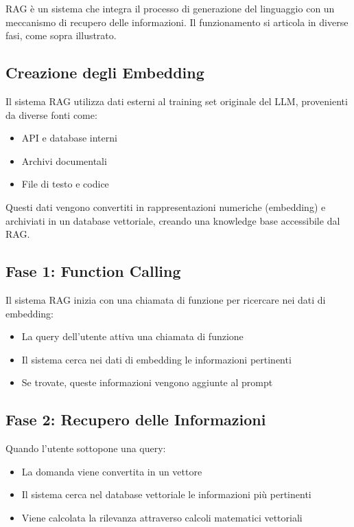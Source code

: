 \documentclass[12pt,a4paper,openright,twoside]{book}
\begin{document}
RAG è un sistema che integra il processo di generazione del linguaggio con un meccanismo di recupero delle informazioni.
Il funzionamento si articola in diverse fasi, come sopra illustrato.

\subsection{Creazione degli Embedding}
Il sistema RAG utilizza dati esterni al training set originale del LLM, provenienti da diverse fonti come:
\begin{itemize}
    \item API e database interni
    \item Archivi documentali
    \item File di testo e codice
\end{itemize}
Questi dati vengono convertiti in rappresentazioni numeriche (embedding) e archiviati in un database vettoriale, creando una knowledge base accessibile dal RAG.

\subsection{Fase 1: Function Calling}
Il sistema RAG inizia con una chiamata di funzione per ricercare nei dati di embedding:
\begin{itemize}
    \item La query dell'utente attiva una chiamata di funzione
    \item Il sistema cerca nei dati di embedding le informazioni pertinenti
    \item Se trovate, queste informazioni vengono aggiunte al prompt
\end{itemize}
\subsection{Fase 2: Recupero delle Informazioni}
Quando l'utente sottopone una query:
\begin{itemize}
    \item La domanda viene convertita in un vettore
    \item Il sistema cerca nel database vettoriale le informazioni più pertinenti
    \item Viene calcolata la rilevanza attraverso calcoli matematici vettoriali
\end{itemize}
\end{document}
